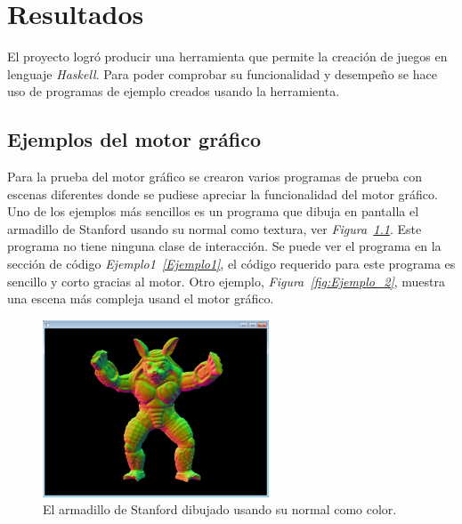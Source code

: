 
\chapter{Resultados}
\label{capitulo5}

\ifpdf
    \graphicspath{{resultados/Figs/Raster/}{resultados/Figs/PDF/}{resultados/Figs/}}
\else
    \graphicspath{{resultados/Figs/Vector/}{resultados/Figs/}}
\fi

El proyecto logró producir una herramienta que permite la creación de juegos en lenguaje \emph{Haskell}. Para poder comprobar su funcionalidad y desempeño se hace uso de programas de ejemplo creados usando la herramienta.

\section{Ejemplos del motor gráfico}

Para la prueba del motor gráfico se crearon varios programas de prueba con escenas diferentes donde se pudiese apreciar la funcionalidad del motor gráfico. Uno de los ejemplos más sencillos es un programa que dibuja en pantalla el armadillo de Stanford usando su normal como textura, ver \emph{Figura~\ref{fig:Ejemplo_1}}. Este programa no tiene ninguna clase de interacción. Se puede ver el programa en la sección de código \emph{Ejemplo1~\ref{Ejemplo1}}, el código requerido para este programa es sencillo y corto gracias al motor. Otro ejemplo, \emph{Figura~\ref{fig:Ejemplo_2}}, muestra una escena más compleja usand el motor gráfico.

\begin{figure}[!ht!]
\centering
\includegraphics[width=0.6\textwidth]{armadillo}
\caption[Ejemplo 1 - Escena simple del motor de gráfico]{El armadillo de Stanford dibujado usando su normal como color.}
\label{fig:Ejemplo_1}
\end{figure}

